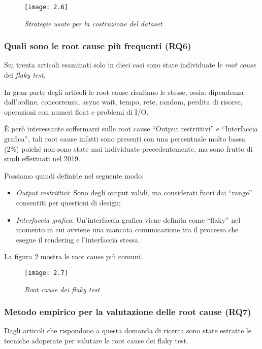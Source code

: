 \begin{figure}[h]
	\centering
	\texttt{[image: 2.6]}
	\caption{\emph{Strategie usate per la costruzione del dataset}}
	\label{fig:fig.2.6}
\end{figure}
\subsubsection{Quali sono le root cause più frequenti (RQ6)}
Sui trenta articoli esaminati solo in dieci casi sono state individuate le \emph{root cause} dei \emph{flaky test}.

In gran parte degli articoli le root cause risultano le stesse,
ossia: dipendenza dall’ordine, concorrenza, async wait, tempo, rete, random, perdita di risorse, operazioni con numeri float e problemi di I/O.

È però interessante soffermarsi sulle root cause “Output restrittivi” e “Interfaccia grafica”, tali root
cause infatti sono presenti con una percentuale molto bassa (2\%) poiché non sono state mai individuate precedentemente, ma sono frutto di studi effettuati nel 2019. 

Possiamo quindi definirle nel seguente modo:
\begin{itemize}
	\item \emph{Output restrittivi}: Sono degli output validi, ma considerati fuori dai “range” consentiti per questioni di design;
	\item \emph{Interfaccia grafica}: Un’interfaccia grafica viene definita come “flaky” nel momento in cui avviene una mancata comunicazione tra il processo che esegue il rendering e l’interfaccia stessa.
\end{itemize}

La figura \ref{fig:fig.2.7} mostra le root cause più comuni.
\newpage
\begin{figure}[h]
	\centering
	\texttt{[image: 2.7]}
	\caption{\emph{Root cause dei flaky test}}
	\label{fig:fig.2.7}
\end{figure}
\subsubsection{Metodo empirico per la valutazione delle root cause (RQ7)}
Dagli articoli che rispondono a questa domanda di ricerca sono state estratte le tecniche adoperate per valutare le root cause dei flaky test.

